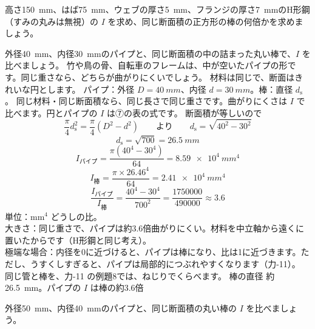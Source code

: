 \begin{jibun}
高さ\qty{150}{mm}、はば\qty{75}{mm}、ウェブの厚さ\qty{5}{mm}、フランジの厚さ\qty{7}{mm}のH形鋼（すみの丸みは無視）の $I$ を求め、同じ断面積の正方形の棒の何倍かを求めましょう。
\end{jibun}

\begin{phreidai}
\label{ph:力-10:ex9}外径\qty{40}{mm}、内径\qty{30}{mm}のパイプと、同じ断面積の中の詰まった丸い棒で、$I$ を比べましょう。
\phbamen
竹や鳥の骨、自転車のフレームは、中が空いたパイプの形です。同じ重さなら、どちらが曲がりにくいでしょう。
\phmushi
材料は同じで、断面はきれいな円とします。
\phzu
パイプ：外径 $D=\qty{40}{mm}$、内径 $d=\qty{30}{mm}$。棒：直径 $d_{\mathrm s}$。
\phriyu
同じ材料・同じ断面積なら、同じ長さで同じ重さです。曲がりにくさは $I$ で比べます。円とパイプの $I$ は⑦の表の式です。
\phtateru
断面積が等しいので
\[\frac{\pi}{4}d_{\mathrm s}^2=\frac{\pi}{4}(D^2-d^2)\qquad\text{より}\qquad d_{\mathrm s}=\sqrt{40^2-30^2}\]
\phtoku
\[ d_{\mathrm s}=\sqrt{700}=\qty{26.5}{mm} \]
\[ I_{\text{パイプ}}=\frac{\pi(40^4-30^4)}{64}=\qty{8.59e4}{mm^4} \]
\[ I_{\text{棒}}=\frac{\pi\times26.46^4}{64}=\qty{2.41e4}{mm^4} \]
\[ \frac{I_{\text{パイプ}}}{I_{\text{棒}}}=\frac{40^4-30^4}{700^2}=\frac{\num{1750000}}{\num{490000}}\approx3.6 \]
\phtashikame
単位：mm$^4$ どうしの比。\\
大きさ：同じ重さで、パイプは約3.6倍曲がりにくい。材料を中立軸から遠くに置いたからです（H形鋼と同じ考え）。\\
極端な場合：内径を0に近づけると、パイプは棒になり、比は1に近づきます。ただし、うすくしすぎると、パイプは局部的につぶれやすくなります（力-11）。
同じ管と棒を、力-11 の例題8では、ねじりでくらべます。
\kotae 棒の直径 約\qty{26.5}{mm}。パイプの $I$ は棒の約3.6倍
\end{phreidai}
\begin{jibun}
外径\qty{50}{mm}、内径\qty{40}{mm}のパイプと、同じ断面積の丸い棒の $I$ を比べましょう。
\end{jibun}

